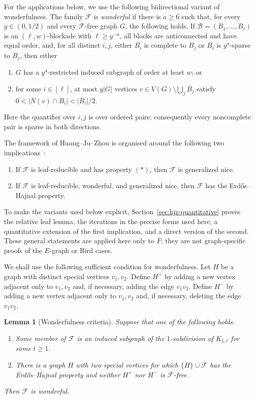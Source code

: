 \documentclass[11pt]{article}
\numberwithin{equation}{section}
\theoremstyle{plain}
\newtheorem{lemma}[theorem]{Lemma}
\theoremstyle{definition}
\begin{document}
For the applications below, we use the following bidirectional variant
of wonderfulness.  The family $\mathcal F$
is \emph{wonderful} if there is $a\geq6$ such that, for every
$y\in(0,1/2)$ and every $\overline{\mathcal F}$-free graph $G$, the
following holds.  If
$\mathcal B=(B_1,\ldots,B_\ell)$ is an $(\ell,w)$-blockade with
$\ell\geq y^{-a}$, all blocks are anticonnected and have equal order,
and, for all distinct $i,j$, either $B_i$ is complete to $B_j$ or
$B_i$ is $y^a$-sparse to $B_j$, then either
\begin{enumerate}[label=(W\arabic*)]
 \item $G$ has a $y^4$-restricted induced subgraph of order at least
       $w$; or
 \item for some $i\in[\ell]$, at most $y|G|$ vertices
       $v\in V(G)\setminus\bigcup_jB_j$ satisfy
       $0<|N(v)\cap B_i|<|B_i|/2$.
\end{enumerate}
Here the quantifier over $i,j$ is over ordered pairs; consequently
every noncomplete pair is sparse in both directions.

The framework of Huang--Ju--Zhou is organised around the following two
implications~\cite{HuangJuZhou2026}:
\begin{enumerate}
 \item If $\mathcal F$ is leaf-reducible and has property $(*)$, then
       $\mathcal F$ is generalized nice.
 \item If $\mathcal F$ is leaf-reducible, wonderful, and generalized
       nice, then $\mathcal F$ has the Erd\H{o}s--Hajnal property.
\end{enumerate}
To make the variants used below explicit,
Section~\ref{sec:hjz-quantitative} proves the relative leaf lemma, the
iterations in the precise forms used here, a quantitative extension of
the first implication, and a direct version of the second.
These general statements are applied here only to $F$; they are not
graph-specific proofs of the $E$-graph or Bird cases.

We shall use the following sufficient condition for wonderfulness.  Let
$H$ be a graph with distinct special vertices $v_1,v_2$.  Define $H^+$
by adding a new vertex adjacent only to $v_1,v_2$ and, if necessary,
adding the edge $v_1v_2$.  Define $H^-$ by adding a new vertex adjacent
only to $v_1,v_2$ and, if necessary, deleting the edge $v_1v_2$.

\begin{lemma}[Wonderfulness criteria]
\label{lem:HJZ-wonderful-criterion}
Suppose that one of the following holds.
\begin{enumerate}[label=(\roman*)]
\item Some member of $\mathcal F$ is an induced subgraph of the
      $1$-subdivision of $K_{1,t}$ for some $t\geq1$.
\item There is a graph $H$ with two special vertices for which
      $\{H\}\cup\overline{\mathcal F}$ has the Erd\H{o}s--Hajnal
      property and neither $H^+$ nor $H^-$ is
      $\overline{\mathcal F}$-free.
\end{enumerate}
Then $\mathcal F$ is wonderful.
\end{lemma}
\end{document}
